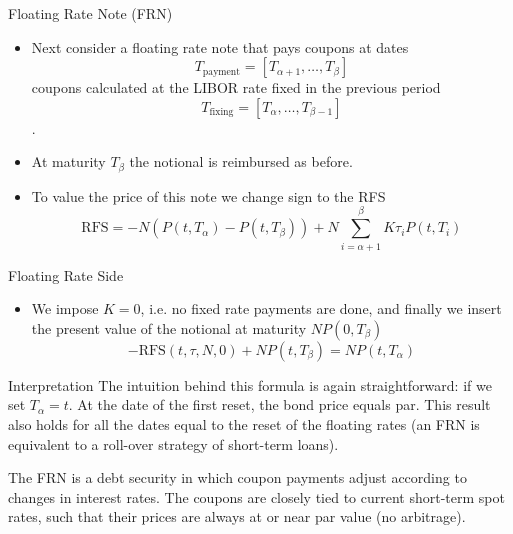 \documentclass{beamer}
\begin{document}
\begin{frame}{Floating Rate Note (FRN)}
	\begin{itemize}
		\item Next consider a floating rate note that pays coupons at dates
		\begin{equation*}
			T_{\text{payment}} = [T_{\alpha+1},\ldots,T_\beta]
		\end{equation*}
		coupons calculated at the LIBOR rate fixed in the previous period
		\begin{equation*}
			T_{\text{fixing}} = [T_{\alpha},\ldots,T_{\beta - 1}]
		\end{equation*}.
		\item At maturity $T_\beta$ the notional is reimbursed as before.
		\item To value the price of this note we change sign to the RFS
		\begin{equation*}
			\text{RFS} = -N(P(t,T_\alpha)-P(t,T_\beta))+N\sum_{i=\alpha+1}^{\beta}K\tau_i P(t,T_i)
		\end{equation*}
	\end{itemize}
\end{frame}

\begin{frame}{Floating Rate Side}
	\begin{itemize}
		\item We impose $K=0$, i.e. no fixed rate payments are done, and finally we insert the present value of the notional at maturity $NP(0,T_\beta)$
		\begin{equation}
			-\text{RFS}(t,\tau,N,0) + NP(t,T_\beta) = NP(t,T_\alpha)
		\end{equation}
	\end{itemize}
	\begin{block}{Interpretation}
		The intuition behind this formula is again straightforward: if we set $T_\alpha =t$. At the date of the first reset, the bond price equals par. This result also holds for all the dates equal to the reset of the floating rates (an FRN is equivalent to a roll-over strategy of short-term loans).
	\end{block}
	The FRN is a debt security in which coupon payments adjust according to changes in interest rates. The coupons are closely tied to current short-term spot rates, such that their prices are always at or near par value (no arbitrage). 
\end{frame}
\end{document}
